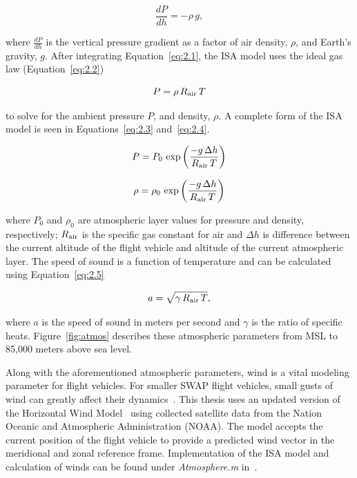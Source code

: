 \begin{equation}
    \frac{dP}{dh} = -\rho \, g,
    \label{eq:2.1}
\end{equation}

where \(\frac{dP}{dh}\) is the vertical pressure gradient as a factor of air density, \( \rho \), and Earth's gravity, \(g\). After integrating Equation~\ref{eq:2.1}, the ISA model uses the ideal gas law (Equation~\ref{eq:2.2})

\begin{equation}
    P = \rho \, R\textsubscript{air} \, T
    \label{eq:2.2}
\end{equation}

to solve for the ambient pressure \(P\), and density, \( \rho \). A complete form of the ISA model is seen in Equations~\ref{eq:2.3} and~\ref{eq:2.4}.

\begin{equation}
    P = P_0\,\exp\left({\frac{-g\,\Delta h}{R\textsubscript{air}\,T}}\right)
    \label{eq:2.3}
\end{equation}

\begin{equation}
    \rho = \rho_0\,\exp\left({\frac{-g\,\Delta h}{R\textsubscript{air}\,T}}\right)
    \label{eq:2.4}
\end{equation}

where \(P_0\) and \(\rho_0\) are atmospheric layer values for pressure and density, respectively; \(R\textsubscript{air}\) is the specific gas constant for air and \(\Delta h\) is difference between the current altitude of the flight vehicle and altitude of the current atmospheric layer. The speed of sound is a function of temperature and can be calculated using Equation~\ref{eq:2.5}

\begin{equation}
    a = \sqrt{\gamma \, R\textsubscript{air}\,T},
    \label{eq:2.5}
\end{equation}

where \(a\) is the speed of sound in meters per second and \( \gamma \) is the ratio of specific heats. Figure~\ref{fig:atmos} describes these atmospheric parameters from MSL to 85,000 meters above sea level.

Along with the aforementioned atmospheric parameters, wind is a vital modeling parameter for flight vehicles. For smaller SWAP flight vehicles, small gusts of wind can greatly affect their dynamics~\cite{raymerAircraftDesignConceptual2018}. This thesis uses an updated version of the Horizontal Wind Model~\cite{drobEmpiricalModelEarth2008,drobUpdateHorizontalWind2015} using collected satellite data from the Nation Oceanic and Atmospheric Administration (NOAA). The model accepts the current position of the flight vehicle to provide a predicted wind vector in the meridional and zonal reference frame. Implementation of the ISA model and calculation of winds can be found under \textit{Atmosphere.m} in~\cite{millerNsm0014thesis2023}.


